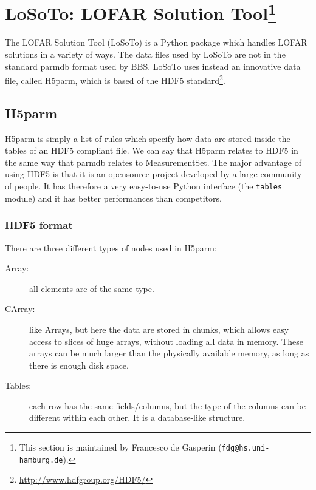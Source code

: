 \documentclass[structabstract]{article}
\begin{document}

\def \losoto {LoSoTo}

\section[LoSoTo: LOFAR Solution Tool]{\losoto: LOFAR Solution Tool\footnote{This section is maintained by Francesco de Gasperin ({\tt fdg@hs.uni-hamburg.de}).}}
\label{BBS}

The LOFAR Solution Tool (\losoto{}) is a Python package which handles LOFAR solutions in a variety of ways. The data files used by \losoto{} are not in the standard parmdb format used by BBS. \losoto{} uses instead an innovative data file, called H5parm, which is based of the HDF5 standard\footnote{\url{http://www.hdfgroup.org/HDF5/}}.

\subsection{H5parm}
\label{losoto:h5parm}

H5parm is simply a list of rules which specify how data are stored inside the tables of an HDF5 compliant file. We can say that H5parm relates to HDF5 in the same way that parmdb relates to MeasurementSet. The major advantage of using HDF5 is that it is an opensource project developed by a large community of people. It has therefore a very easy-to-use Python interface (the \texttt{tables} module) and it has better performances than competitors.

\subsubsection{HDF5 format}
\label{losoto:HDF5}

There are three different types of nodes used in H5parm:
\begin{description}
 \item[Array:] all elements are of the same type.
 \item[CArray:] like Arrays, but here the data are stored in chunks, which allows easy access to
slices of huge arrays, without loading all data in memory. These arrays can be much
larger than the physically available memory, as long as there is enough disk space.
 \item[Tables:] each row has the same fields/columns, but the type of the columns can be different within each other. It is a database-like structure.
\end{description}
\end{document}
